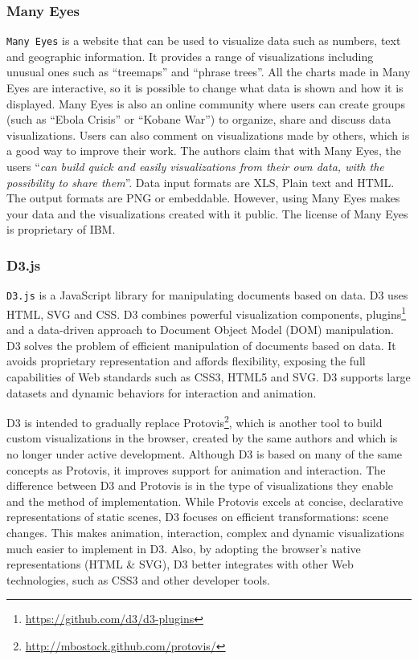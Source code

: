 \subsubsection{Many Eyes}
\label{sec:manyEyes}
\texttt{Many Eyes} \cite{ibm2010} is a website that can be used to visualize data such as numbers, text and geographic information. It provides a range of visualizations including unusual ones such as ``treemaps''  and ``phrase trees''. All the charts made in Many Eyes are interactive, so it is possible to change what data is shown and how it is displayed. Many Eyes is also an online community where users can create groups (such as ``Ebola Crisis'' or ``Kobane War'') to organize, share and discuss data visualizations. Users can also comment on visualizations made by others, which is a good way to improve their work. The authors claim that with Many Eyes, the users ``\textit{can build quick and easily visualizations from their own data, with the possibility to share them}''. Data input formats are XLS, Plain text and HTML. The output formats are PNG or embeddable. However, using Many Eyes makes  your data and the visualizations created with it public. The license of Many Eyes is proprietary of IBM.

\subsubsection{D3.js}
\label{sec:d3js}
\texttt{D3.js} \cite{d3js} is a JavaScript library for manipulating documents based on data. D3 uses HTML, SVG and CSS. D3 combines powerful visualization components, plugins\footnote{\url{https://github.com/d3/d3-plugins}}  and a data-driven approach to Document Object Model (DOM) manipulation. D3 solves the problem of efficient manipulation of documents based on data. It avoids proprietary representation and affords flexibility, exposing the full capabilities of Web standards such as CSS3, HTML5 and SVG. D3 supports large datasets and dynamic behaviors for interaction and animation.

D3 is intended to gradually replace Protovis\footnote{\url{http://mbostock.github.com/protovis/}}, which is another tool to build custom visualizations in the browser, created by the same authors and which is no longer under active development. Although D3 is based on many of the same concepts as Protovis, it improves support for animation and interaction. The difference between D3 and Protovis  is in the type of visualizations they enable and the method of implementation. While Protovis excels at concise, declarative representations of static scenes, D3 focuses on efficient transformations: scene changes. This makes animation, interaction, complex and dynamic visualizations much easier to implement in D3. Also, by adopting the browser's native representations (HTML \& SVG), D3 better integrates with other Web technologies, such as CSS3 and other developer tools.

